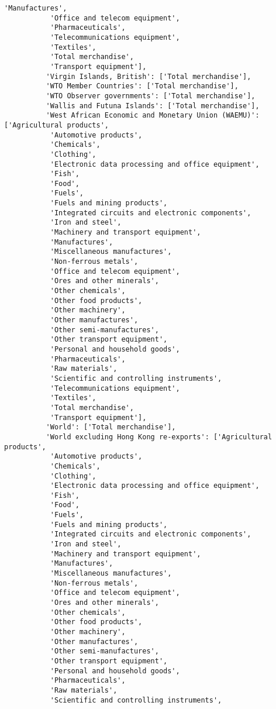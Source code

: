 \documentclass[11pt]{article}
\begin{document}
\begin{Verbatim}[commandchars=\\\{\}]
           'Manufactures',
           'Office and telecom equipment',
           'Pharmaceuticals',
           'Telecommunications equipment',
           'Textiles',
           'Total merchandise',
           'Transport equipment'],
          'Virgin Islands, British': ['Total merchandise'],
          'WTO Member Countries': ['Total merchandise'],
          'WTO Observer governments': ['Total merchandise'],
          'Wallis and Futuna Islands': ['Total merchandise'],
          'West African Economic and Monetary Union (WAEMU)': ['Agricultural products',
           'Automotive products',
           'Chemicals',
           'Clothing',
           'Electronic data processing and office equipment',
           'Fish',
           'Food',
           'Fuels',
           'Fuels and mining products',
           'Integrated circuits and electronic components',
           'Iron and steel',
           'Machinery and transport equipment',
           'Manufactures',
           'Miscellaneous manufactures',
           'Non-ferrous metals',
           'Office and telecom equipment',
           'Ores and other minerals',
           'Other chemicals',
           'Other food products',
           'Other machinery',
           'Other manufactures',
           'Other semi-manufactures',
           'Other transport equipment',
           'Personal and household goods',
           'Pharmaceuticals',
           'Raw materials',
           'Scientific and controlling instruments',
           'Telecommunications equipment',
           'Textiles',
           'Total merchandise',
           'Transport equipment'],
          'World': ['Total merchandise'],
          'World excluding Hong Kong re-exports': ['Agricultural products',
           'Automotive products',
           'Chemicals',
           'Clothing',
           'Electronic data processing and office equipment',
           'Fish',
           'Food',
           'Fuels',
           'Fuels and mining products',
           'Integrated circuits and electronic components',
           'Iron and steel',
           'Machinery and transport equipment',
           'Manufactures',
           'Miscellaneous manufactures',
           'Non-ferrous metals',
           'Office and telecom equipment',
           'Ores and other minerals',
           'Other chemicals',
           'Other food products',
           'Other machinery',
           'Other manufactures',
           'Other semi-manufactures',
           'Other transport equipment',
           'Personal and household goods',
           'Pharmaceuticals',
           'Raw materials',
           'Scientific and controlling instruments',

\end{Verbatim}
\end{document}
